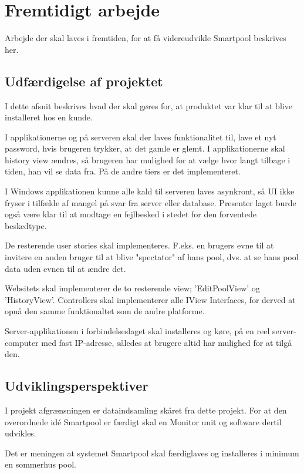 \chapter{Fremtidigt arbejde}
Arbejde der skal laves i fremtiden, for at få videreudvikle Smartpool beskrives her.
\section{Udfærdigelse af projektet}
I dette afsnit beskrives hvad der skal gøres for, at produktet var klar til at blive installeret hos en kunde.

I applikationerne og på serveren skal der laves funktionalitet til, lave et nyt password, hvis brugeren trykker, at det gamle er glemt.
I applikationerne skal history view ændres, så brugeren har mulighed for at vælge hvor langt tilbage i tiden, han vil se data fra. På de andre tiers er det implementeret.

I Windows applikationen kunne alle kald til serveren laves asynkront, så UI ikke fryser i tilfælde af mangel på svar fra server eller database. Presenter laget burde også være klar til at modtage en fejlbesked i stedet for den forventede beskedtype.

De resterende user stories skal implementeres. F.eks. en brugers evne til at invitere en anden bruger til at blive "spectator" af hans pool, dvs. at se hans pool data uden evnen til at ændre det.

Websitets skal implementerer de to resterende view; 'EditPoolView' og 'HistoryView'. Controllers skal implementerer alle IView Interfaces, for derved at opnå den samme funktionaltet som de andre platforme.

Server-applikationen i forbindelseslaget skal installeres og køre, på en reel server-computer med fast IP-adresse, således at brugere altid har mulighed for at tilgå den.


\section{Udviklingsperspektiver}
I projekt afgrænsningen er dataindsamling skåret fra dette projekt. For at den overordnede idé Smartpool er færdigt skal en Monitor unit og software dertil udvikles.

Det er meningen at systemet Smartpool skal færdiglaves og installeres i minimum en sommerhus pool.